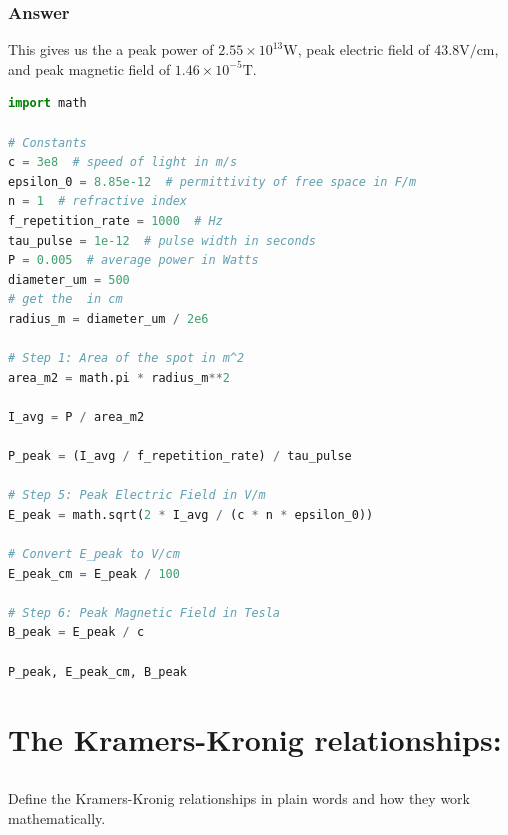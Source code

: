 \documentclass[12pt]{article}
\begin{document}
\subsubsection{Answer}
This gives us the a peak power of $2.55 \times 10^{13} \mathrm{W}$, peak electric field of $43.8 \mathrm{V} / \mathrm{cm}$, and peak magnetic field of $1.46 \times 10^{-5} \mathrm{T}$.
\begin{lstlisting}[language=Python]
import math

# Constants
c = 3e8  # speed of light in m/s
epsilon_0 = 8.85e-12  # permittivity of free space in F/m
n = 1  # refractive index
f_repetition_rate = 1000  # Hz
tau_pulse = 1e-12  # pulse width in seconds
P = 0.005  # average power in Watts
diameter_um = 500
# get the  in cm
radius_m = diameter_um / 2e6

# Step 1: Area of the spot in m^2
area_m2 = math.pi * radius_m**2

I_avg = P / area_m2

P_peak = (I_avg / f_repetition_rate) / tau_pulse

# Step 5: Peak Electric Field in V/m
E_peak = math.sqrt(2 * I_avg / (c * n * epsilon_0))

# Convert E_peak to V/cm
E_peak_cm = E_peak / 100

# Step 6: Peak Magnetic Field in Tesla
B_peak = E_peak / c

P_peak, E_peak_cm, B_peak

\end{lstlisting}
\section{The Kramers-Kronig relationships:}
\subsection{}
Define the Kramers-Kronig relationships in plain words and how they work mathematically.
\end{document}
